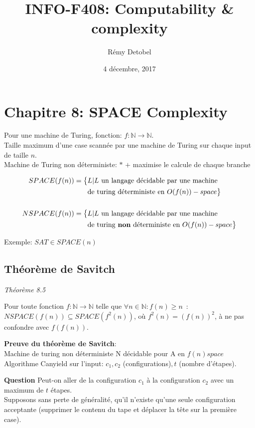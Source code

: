 \documentclass[a4paper,12pt]{article}
\title{INFO-F408: Computability \& complexity}
\date{4 décembre, 2017}
\author{Rémy Detobel}
\begin{document}
\maketitle
\newpage

\section{Chapitre 8: SPACE Complexity}
  Pour une machine de Turing, fonction: $f: \mathbb{N} \rightarrow \mathbb{N}$.\\
  Taille maximum d'une case scannée par une machine de Turing sur chaque input de taille $n$.\\

  Machine de Turing non déterministe: $*$ $+$ maximise le calcule de chaque branche

  \begin{align*}
    SPACE(f(n)) = \big\{&L | L \text{ un langage décidable par une machine}\\
    &\text{de turing déterministe en } O(f(n))-space \big\}\\
    \\
    NSPACE(f(n)) = \big\{&L | L \text{ un langage décidable par une machine}\\
    &\text{de turing \textbf{non} déterministe en } O(f(n))-space \big\}
  \end{align*}

  Exemple: $SAT \in SPACE(n)$

  \subsection{Théorème de Savitch}
    \textit{Théorème 8.5}
    \begin{theoremeBox}
      Pour toute fonction $f : \mathbb N \to \mathbb N$ telle que $\forall n \in \mathbb N : f(n) \geq n$~:\\
      $NSPACE(f(n)) \subseteq SPACE(f^2(n))$, où $f^2(n) = (f(n))^2$, à ne pas confondre avec $f(f(n))$.  %
    \end{theoremeBox}

    \textbf{Preuve du théorème de Savitch}:\\
    Machine de turing non déterministe N décidable pour A en $f(n) space$\\
    Algorithme Canyield sur l'input: $c_1, c_2$ (configurations)$, t$ (nombre d'étapes).

    \textbf{Question} Peut-on aller de la configuration $c_1$ à la configuration $c_2$ avec un maximum de $t$ étapes.\\
    Supposons sans perte de généralité, qu'il n'existe qu'une seule configuration acceptante
		(supprimer le contenu du tape et déplacer la tête sur la première case).\\
\end{document}
